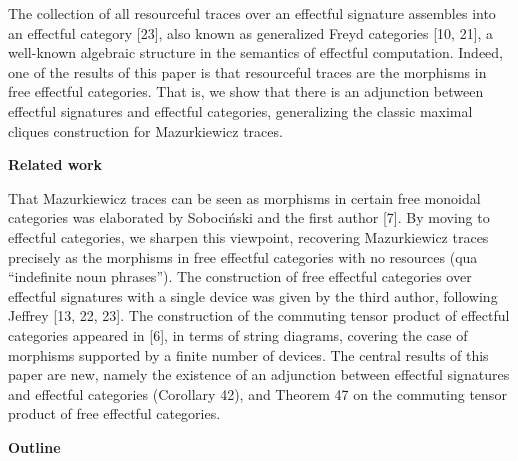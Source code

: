  
 
The collection of all resourceful traces over an effectful signature assembles into an effectful category [23], also known as generalized Freyd categories [10, 21], a well-known algebraic structure in the semantics of effectful computation. Indeed, one of the results of this paper is that resourceful traces are the morphisms in free effectful categories. That is, we show that there is an adjunction between effectful signatures and effectful categories, generalizing the classic maximal cliques construction for Mazurkiewicz traces.\par
 
 
 
\par\medskip\noindent\textbf{Related work}\par
 
 
That Mazurkiewicz traces can be seen as morphisms in certain free monoidal categories was elaborated by Sobociński and the first author [7]. By moving to effectful categories, we sharpen this viewpoint, recovering Mazurkiewicz traces precisely as the morphisms in free effectful categories with no resources (qua “indefinite noun phrases”). The construction of free effectful categories over effectful signatures with a single device was given by the third author, following Jeffrey [13, 22, 23]. The construction of the commuting tensor product of effectful categories appeared in [6], in terms of string diagrams, covering the case of morphisms supported by a finite number of devices. The central results of this paper are new, namely the existence of an adjunction between effectful signatures and effectful categories (Corollary 42), and Theorem 47 on the commuting tensor product of free effectful categories.\par
 
 
 
 
\par\medskip\noindent\textbf{Outline}\par
 
 
